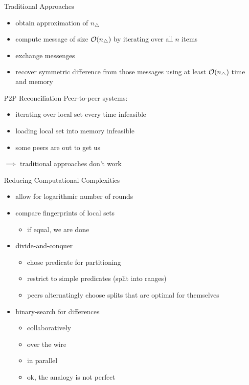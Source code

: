 \documentclass{beamer}
\begin{document}
\begin{frame}{Traditional Approaches}
    \begin{itemize}
        \item obtain approximation of $n_{\triangle}$
        \item compute message of size $\mathcal{O}(n_{\triangle})$ by iterating over all $n$ items
        \item exchange messenges
        \item recover symmetric difference from those messages using at least $\mathcal{O}(n_{\triangle})$ time and memory
    \end{itemize}
\end{frame}

\begin{frame}{P2P Reconciliation}
    Peer-to-peer systems:
    \begin{itemize}
        \item iterating over local set every time infeasible
        \item loading local set into memory infeasible
        \item some peers are out to get us
    \end{itemize}

    \pause

    $\implies$ traditional approaches don't work
\end{frame}

\begin{frame}{Reducing Computational Complexities}
    \begin{itemize}
        \item allow for logarithmic number of rounds\pause
        \item compare fingerprints of local sets\pause \begin{itemize}
            \item if equal, we are done
        \end{itemize}\pause
        \item divide-and-conquer\pause \begin{itemize}
            \item chose predicate for partitioning\pause
            \item restrict to simple predicates (split into ranges)\pause
            \item peers alternatingly choose splits that are optimal for themselves
        \end{itemize}\pause
        \item binary-search for differences\pause \begin{itemize}
            \item collaboratively
            \item over the wire
            \item in parallel
            \item ok, the analogy is not perfect
        \end{itemize}
    \end{itemize}
\end{frame}
\end{document}
